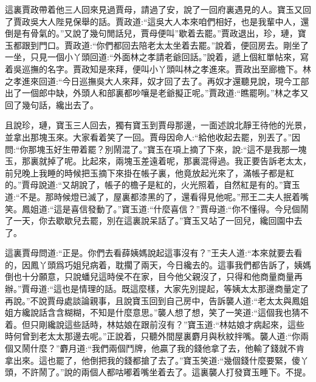 \begin{parag}
    這裏賈政帶着他三人回來見過賈母，請過了安，說了一回府裏遇見的人。寶玉又回了賈政吳大人陛見保舉的話。賈政道:“這吳大人本來咱們相好，也是我輩中人，還倒是有骨氣的。”又說了幾句閒話兒，賈母便叫”歇着去罷。”賈政退出，珍，璉，寶玉都跟到門口。賈政道:“你們都回去陪老太太坐着去罷。”說着，便回房去。剛坐了一坐，只見一個小丫頭回道:“外面林之孝請老爺回話。”說着，遞上個紅單帖來，寫着吳巡撫的名字。賈政知是來拜，便叫小丫頭叫林之孝進來。賈政出至廊檐下。林之孝進來回道:“今日巡撫吳大人來拜，奴才回了去了。再奴才還聽見說，現今工部出了一個郎中缺，外頭人和部裏都吵嚷是老爺擬正呢。”賈政道:“瞧罷咧。”林之孝又回了幾句話，纔出去了。
\end{parag}


\begin{parag}
    且說珍，璉，寶玉三人回去，獨有寶玉到賈母那邊，一面述說北靜王待他的光景，並拿出那塊玉來。大家看着笑了一回。賈母因命人:“給他收起去罷，別丟了。”因問:“你那塊玉好生帶着罷？別鬧混了。”寶玉在項上摘了下來，說:“這不是我那一塊玉，那裏就掉了呢。比起來，兩塊玉差遠着呢，那裏混得過。我正要告訴老太太，前兒晚上我睡的時候把玉摘下來掛在帳子裏，他竟放起光來了，滿帳子都是紅的。”賈母說道:“又胡說了，帳子的檐子是紅的，火光照着，自然紅是有的。”寶玉道:“不是。那時候燈已滅了，屋裏都漆黑的了，還看得見他呢。”邢王二夫人抿着嘴笑。鳳姐道:“這是喜信發動了。”寶玉道:“什麼喜信？”賈母道:“你不懂得。今兒個鬧了一天，你去歇歇兒去罷，別在這裏說呆話了。”寶玉又站了一回兒，纔回園中去了。
\end{parag}


\begin{parag}
    這裏賈母問道:“正是。你們去看薛姨媽說起這事沒有？”王夫人道:“本來就要去看的，因鳳丫頭爲巧姐兒病着，耽擱了兩天，今日纔去的。這事我們都告訴了，姨媽倒也十分願意，只說蟠兒這時侯不在家，目今他父親沒了，只得和他商量商量再辦。”賈母道:“這也是情理的話。既這麼樣，大家先別提起，等姨太太那邊商量定了再說。”不說賈母處談論親事，且說寶玉回到自己房中，告訴襲人道:“老太太與鳳姐姐方纔說話含含糊糊，不知是什麼意思。”襲人想了想，笑了一笑道:“這個我也猜不着。但只剛纔說這些話時，林姑娘在跟前沒有？”寶玉道:“林姑娘才病起來，這些時何曾到老太太那邊去呢。”正說着，只聽外間屋裏麝月與秋紋拌嘴。襲人道:“你兩個又鬧什麼？”麝月道:“我們兩個鬥牌，他贏了我的錢他拿了去，他輸了錢就不肯拿出來。這也罷了，他倒把我的錢都搶了去了。”寶玉笑道:“幾個錢什麼要緊，傻丫頭，不許鬧了。”說的兩個人都咕嘟着嘴坐着去了。這裏襲人打發寶玉睡下。不提。
\end{parag}



